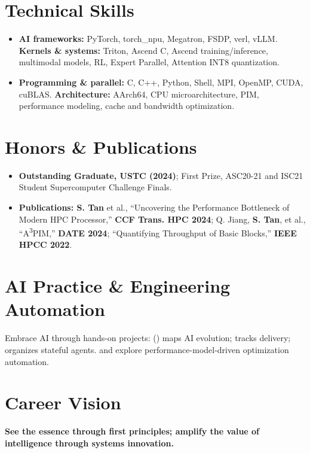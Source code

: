 \documentclass{resume}
\begin{document}
\section{Technical Skills}
\begin{itemize}
  \item \textbf{AI frameworks:} PyTorch, torch\_npu, Megatron, FSDP, verl, vLLM. \textbf{Kernels \& systems:} Triton, Ascend C, Ascend training/inference, multimodal models, RL, Expert Parallel, Attention INT8 quantization.
  \item \textbf{Programming \& parallel:} C, C++, Python, Shell, MPI, OpenMP, CUDA, cuBLAS. \textbf{Architecture:} AArch64, CPU microarchitecture, PIM, performance modeling, cache and bandwidth optimization.
\end{itemize}

\section{Honors \& Publications}
\begin{itemize}
  \item \textbf{Outstanding Graduate, USTC (2024)}; First Prize, ASC20-21 and ISC21 Student Supercomputer Challenge Finals.
  \small
  \item \textbf{Publications: S. Tan} et al., ``Uncovering the Performance Bottleneck of Modern HPC Processor,'' \textbf{CCF Trans. HPC 2024}; Q. Jiang, \textbf{S. Tan}, et al., ``A\textsuperscript{3}PIM,'' \textbf{DATE 2024}; ``Quantifying Throughput of Basic Blocks,'' \textbf{IEEE HPCC 2022}.
\end{itemize}

\section{AI Practice \& Engineering Automation}
\noindent Embrace AI through hands-on projects:  () maps AI evolution;  tracks delivery;  organizes stateful agents.  and  explore performance-model-driven optimization automation.

\section{Career Vision}
\noindent\textbf{See the essence through first principles; amplify the value of intelligence through systems innovation.}
\end{document}
